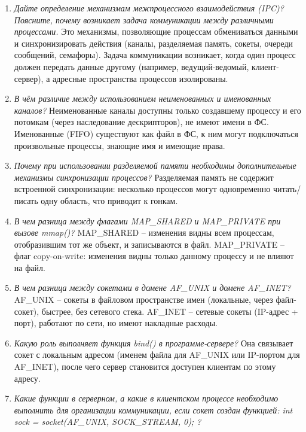 \begin{enumerate}
	\item \textit{Дайте определение механизмам межпроцессного взаимодействия (IPC)? Поясните, почему возникает задача коммуникации между различными процессами.}\newline 
	Это механизмы, позволяющие процессам обмениваться данными и синхронизировать действия (каналы, разделяемая память, сокеты, очереди сообщений, семафоры). 
	Задача коммуникации возникает, когда один процесс должен передать данные другому (например, ведущий-ведомый, клиент-сервер), а адресные пространства процессов изолированы.
	\item \textit{В чём различие между использованием неименованных и именованных каналов?}\newline 
	Неименованные каналы доступны только создавшему процессу и его потомкам (через наследование дескрипторов), не имеют имени в ФС. 
	Именованные (FIFO) существуют как файл в ФС, к ним могут подключаться произвольные процессы, знающие имя и имеющие права.
	\item \textit{Почему при использовании разделяемой памяти необходимы дополнительные механизмы синхронизации процессов?}\newline
	Разделяемая память не содержит встроенной синхронизации: несколько процессов могут одновременно читать/писать одну область, что приводит к гонкам.
	\item \textit{В чем разница между флагами MAP\_SHARED и MAP\_PRIVATE при вызове mmap()?}\newline 
	MAP\_SHARED -- изменения видны всем процессам, отобразившим тот же объект, и записываются в файл. 
	MAP\_PRIVATE -- флаг copy-on-write: изменения видны только данному процессу и не влияют на файл.
	\item \textit{В чем разница между сокетами в домене AF\_UNIX и домене AF\_INET?}\newline 
	AF\_UNIX -- сокеты в файловом пространстве имен (локальные, через файл-сокет), быстрее, без сетевого стека. 
	AF\_INET -- сетевые сокеты (IP-адрес + порт), работают по сети, но имеют накладные расходы.
	\item \textit{Какую роль выполняет функция bind() в программе-сервере?}\newline 
	Она связывает сокет с локальным адресом (именем файла для AF\_UNIX или IP-портом для AF\_INET), после чего сервер становится доступен клиентам по этому адресу.
	\item \textit{Какие функции в серверном, а какие в клиентском процессе необходимо выполнить для организации коммуникации, если сокет создан функцией: int sock = socket(AF\_UNIX, SOCK\_STREAM, 0); ?}\newline 

\end{enumerate}
